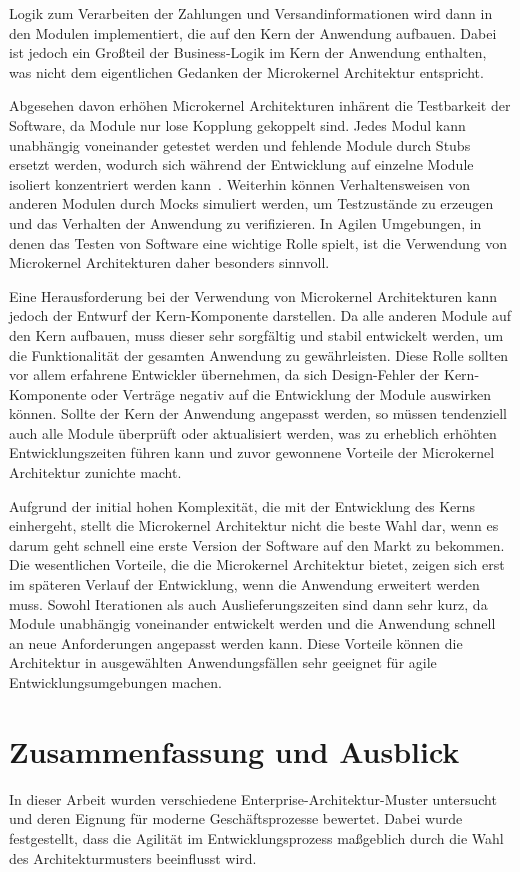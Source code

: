 \documentclass[acmtog]{acmart}
\begin{document}
Logik zum Verarbeiten der Zahlungen und Versandinformationen wird dann in den Modulen implementiert, die auf den Kern der Anwendung aufbauen.
Dabei ist jedoch ein Großteil der Business-Logik im Kern der Anwendung enthalten, was nicht dem eigentlichen Gedanken der Microkernel Architektur entspricht.

Abgesehen davon erhöhen Microkernel Architekturen inhärent die Testbarkeit der Software, da Module nur lose Kopplung gekoppelt sind.
Jedes Modul kann unabhängig voneinander getestet werden und fehlende Module durch Stubs ersetzt werden, wodurch sich während der Entwicklung auf einzelne Module isoliert konzentriert werden kann~\cite[26]{architecturePatterns}.
Weiterhin können Verhaltensweisen von anderen Modulen durch Mocks simuliert werden, um Testzustände zu erzeugen und das Verhalten der Anwendung zu verifizieren.
In Agilen Umgebungen, in denen das Testen von Software eine wichtige Rolle spielt, ist die Verwendung von Microkernel Architekturen daher besonders sinnvoll.

Eine Herausforderung bei der Verwendung von Microkernel Architekturen kann jedoch der Entwurf der Kern-Komponente darstellen.
Da alle anderen Module auf den Kern aufbauen, muss dieser sehr sorgfältig und stabil entwickelt werden, um die Funktionalität der gesamten Anwendung zu gewährleisten.
Diese Rolle sollten vor allem erfahrene Entwickler übernehmen, da sich Design-Fehler der Kern-Komponente oder Verträge negativ auf die Entwicklung der Module auswirken können.
Sollte der Kern der Anwendung angepasst werden, so müssen tendenziell auch alle Module überprüft oder aktualisiert werden, was zu erheblich erhöhten Entwicklungszeiten führen kann und zuvor gewonnene Vorteile der Microkernel Architektur zunichte macht.

Aufgrund der initial hohen Komplexität, die mit der Entwicklung des Kerns einhergeht, stellt die Microkernel Architektur nicht die beste Wahl dar, wenn es darum geht schnell eine erste Version der Software auf den Markt zu bekommen.
Die wesentlichen Vorteile, die die Microkernel Architektur bietet, zeigen sich erst im späteren Verlauf der Entwicklung, wenn die Anwendung erweitert werden muss.
Sowohl Iterationen als auch Auslieferungszeiten sind dann sehr kurz, da Module unabhängig voneinander entwickelt werden und die Anwendung schnell an neue Anforderungen angepasst werden kann.
Diese Vorteile können die Architektur in ausgewählten Anwendungsfällen sehr geeignet für agile Entwicklungsumgebungen machen.

\section{Zusammenfassung und Ausblick}
\label{sec:summary}
In dieser Arbeit wurden verschiedene Enterprise-Architektur-Muster untersucht und deren Eignung für moderne Geschäftsprozesse bewertet.
Dabei wurde festgestellt, dass die Agilität im Entwicklungsprozess maßgeblich durch die Wahl des Architekturmusters beeinflusst wird.
\end{document}

